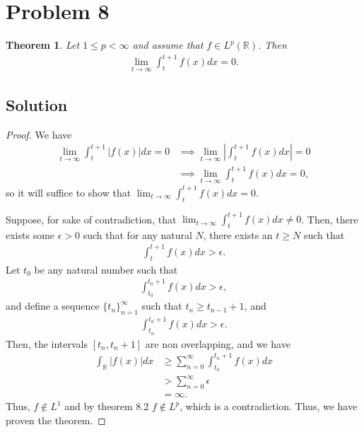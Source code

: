 \documentclass[10pt,a4paper]{article}
\theoremstyle{theorem}
\newtheorem{theorem}{Theorem}
\theoremstyle{definition}
\begin{document}
\section*{Problem 8}
\begin{theorem}
Let $1 \leq p < \infty$ and assume that $f \in L^p(\mathbb{R})$. Then
\begin{align*}
\lim_{t \to \infty} \int_t^{t + 1} f(x) dx = 0.
\end{align*}
\end{theorem}

\subsection*{Solution}
\begin{proof}
We have
\begin{align*}
\lim_{t \to \infty} \int_t^{t + 1} |f(x)| dx = 0 &\implies  \lim_{t \to \infty} \left| \int_t^{t + 1} f(x) dx \right| = 0\\
&\implies \lim_{t \to \infty} \int_t^{t + 1} f(x) dx = 0,
\end{align*}
so it will suffice to show that $\lim_{t \to \infty} \int_t^{t + 1} f(x) dx = 0$.

Suppose, for sake of contradiction, that $\lim_{t \to \infty} \int_t^{t + 1} f(x) dx \not = 0$. Then, there exists some $\epsilon > 0$ such that for any natural $N$, there exists an $t \geq N$ such that 
\begin{align*}
\int_t^{t + 1} f(x) dx > \epsilon.
\end{align*}
Let $t_0$ be any natural number such that 
\begin{align*}
\int_{t_0}^{t_0 + 1} f(x) dx > \epsilon,
\end{align*}
and define a sequence $\{t_n \}_{n=1}^\infty$ such that $t_n \geq t_{n-1} + 1$, and 
\begin{align*}
\int_{t_n}^{t_n + 1} f(x) dx > \epsilon.
\end{align*}
Then, the intervals $[t_{n}, t_{n} + 1]$ are non overlapping, and we have
\begin{align*}
\int_{\mathbb{R}} |f(x)|dx &\geq \sum_{n = 0}^\infty \int_{t_n}^{t_n + 1} f(x) dx \\
&> \sum_{n = 0}^\infty \epsilon\\
&= \infty.
\end{align*}
Thus, $f \not \in L^1$ and by theorem 8.2 $f \not \in L^p$, which is a contradiction. Thus, we have proven the theorem.
\end{proof}
\end{document}
